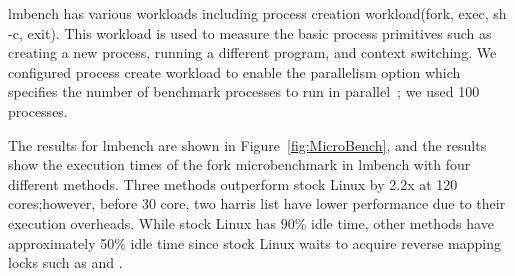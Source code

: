 \ifkor
lmbench has various workloads including process creation workload(fork,
exec, sh -c, exit).
This workload is used to measure the basic process primitives such as creating
a new process, running a different program, and context switching. 
We configured process create workload to enable the parallelism option which
specifies the number of benchmark processes to run in
parallel~\cite{mcvoy1996lmbench}; we used 100 processes.
\else
\fi

\ifkor
The results for lmbench are shown in Figure~\ref{fig:MicroBench}, 
and the results show the execution times of the fork microbenchmark in lmbench
with four different methods.
Three methods outperform stock Linux by 2.2x at 120 cores;however, before 30
core, two harris list have lower performance due to their execution overheads.
While stock Linux has 90\% idle time, other methods have approximately 50\%
idle time since stock Linux waits to acquire reverse mapping locks such as
 and .

\else
\fi



